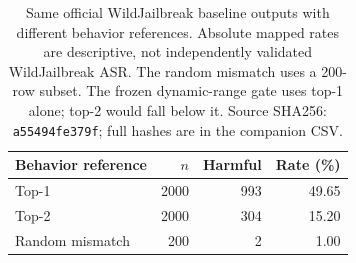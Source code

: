\begin{table}[t]
\centering\small
\begin{tabular}{lrrr}
\toprule
Behavior reference & $n$ & Harmful & Rate (\%) \\
\midrule
Top-1 & 2000 & 993 & 49.65 \\
Top-2 & 2000 & 304 & 15.20 \\
Random mismatch & 200 & 2 & 1.00 \\
\bottomrule
\end{tabular}
\caption{Same official WildJailbreak baseline outputs with different behavior references. Absolute mapped rates are descriptive, not independently validated WildJailbreak ASR. The random mismatch uses a 200-row subset. The frozen dynamic-range gate uses top-1 alone; top-2 would fall below it. Source SHA256: \texttt{a55494fe379f}; full hashes are in the companion CSV.}
\label{tab:wjb-reference-three}
\end{table}
